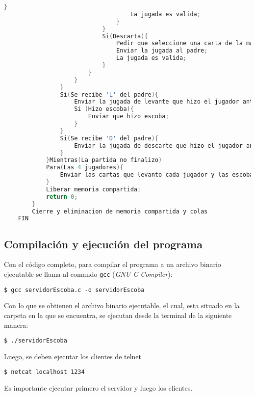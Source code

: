 \begin{lstlisting}[language=C]
                                    }
                                    La jugada es valida;
                                }
                            }
                            Si(Descarta){
                                Pedir que seleccione una carta de la mano para descartar;
                                Enviar la jugada al padre;
                                La jugada es valida;
                            }
                        }
                    }
                }
                Si(Se recibe 'L' del padre){
                    Enviar la jugada de levante que hizo el jugador anterior;
                    Si (Hizo escoba){
                        Enviar que hizo escoba;
                    }
                }
                Si(Se recibe 'D' del padre){
                    Enviar la jugada de descarte que hizo el jugador anterior;
                }
            }Mientras(La partida no finalizo)
            Para(Las 4 jugadores){
                Enviar las cartas que levanto cada jugador y las escobas;
            }
            Liberar memoria compartida;
            return 0;
        }
        Cierre y eliminacion de memoria compartida y colas
    FIN
\end{lstlisting}

\subsection{Compilación y ejecución del programa}

Con el código completo, para compilar el programa a un archivo binario ejecutable se llama al comando \texttt{gcc} (\textit{GNU C Compiler}):

\begin{center}
    \texttt{\$ gcc servidorEscoba.c -o servidorEscoba}\\
\end{center}

Con lo que se obtienen el archivo binario ejecutable, el cual, esta situado en la carpeta en la que se encuentra, se ejecutan desde la terminal de la siguiente manera:

\begin{center}
    \texttt{\$ ./servidorEscoba}\\
\end{center}

Luego, se deben ejecutar los clientes de telnet

\begin{center}
    \texttt{\$ netcat localhost 1234}\\
\end{center}

Es importante ejecutar primero el servidor y luego los clientes.